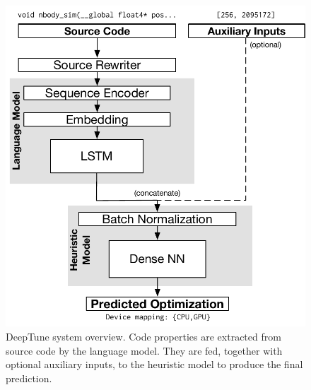 \begin{figure}
  \centering
  \includegraphics[width=.95\columnwidth]{img/deeptune} %
  \caption[DeepTune system overview]{%
    DeepTune system overview. Code properties are extracted from source code by the
    language model. They are fed, together with optional auxiliary inputs, to
    the heuristic model to produce the final prediction.%
  }%
  \label{fig:deeptune}
\end{figure}
